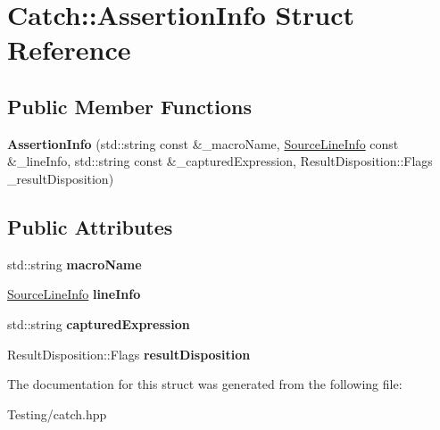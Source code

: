 \hypertarget{struct_catch_1_1_assertion_info}{\section{Catch\-:\-:Assertion\-Info Struct Reference}
\label{struct_catch_1_1_assertion_info}
}
\subsection*{Public Member Functions}
\begin{DoxyCompactItemize}
\item 
\hypertarget{struct_catch_1_1_assertion_info_aaf6cc3eebd40391e54d37ed42953c73f}{{\bfseries Assertion\-Info} (std\-::string const \&\-\_\-macro\-Name, \hyperlink{struct_catch_1_1_source_line_info}{Source\-Line\-Info} const \&\-\_\-line\-Info, std\-::string const \&\-\_\-captured\-Expression, Result\-Disposition\-::\-Flags \-\_\-result\-Disposition)}\label{struct_catch_1_1_assertion_info_aaf6cc3eebd40391e54d37ed42953c73f}

\end{DoxyCompactItemize}
\subsection*{Public Attributes}
\begin{DoxyCompactItemize}
\item 
\hypertarget{struct_catch_1_1_assertion_info_ac2e59e8c89e00eb3390768f50d540b18}{std\-::string {\bfseries macro\-Name}}\label{struct_catch_1_1_assertion_info_ac2e59e8c89e00eb3390768f50d540b18}

\item 
\hypertarget{struct_catch_1_1_assertion_info_a17bdbb404ba12658034f833be2f4c3e7}{\hyperlink{struct_catch_1_1_source_line_info}{Source\-Line\-Info} {\bfseries line\-Info}}\label{struct_catch_1_1_assertion_info_a17bdbb404ba12658034f833be2f4c3e7}

\item 
\hypertarget{struct_catch_1_1_assertion_info_af7c1d3cbfa346e9a303030fa0ef0cb54}{std\-::string {\bfseries captured\-Expression}}\label{struct_catch_1_1_assertion_info_af7c1d3cbfa346e9a303030fa0ef0cb54}

\item 
\hypertarget{struct_catch_1_1_assertion_info_a60353b3632ab2f827162f2b2d6911073}{Result\-Disposition\-::\-Flags {\bfseries result\-Disposition}}\label{struct_catch_1_1_assertion_info_a60353b3632ab2f827162f2b2d6911073}

\end{DoxyCompactItemize}


The documentation for this struct was generated from the following file\-:\begin{DoxyCompactItemize}
\item 
Testing/catch.\-hpp\end{DoxyCompactItemize}
